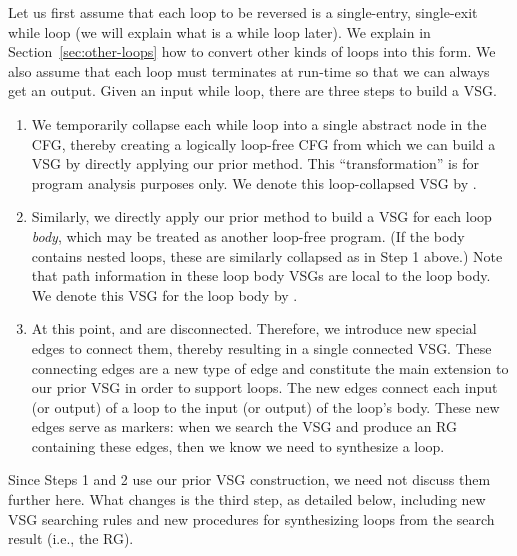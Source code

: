 Let us first assume that each loop to be reversed is a single-entry, single-exit while loop (we will explain what is a while loop later).
We explain in Section~\ref{sec:other-loops} how to convert other kinds of loops into this form.
We also assume that each loop must terminates at run-time so that we can always get an output.
Given an input while loop, there are three steps to build a VSG.
%
\begin{enumerate}

\item We temporarily collapse each while loop into a single abstract node in the CFG, thereby creating a logically loop-free CFG from which we can build a VSG by directly applying our prior method.
This ``transformation'' is for program analysis purposes only. 
We denote this loop-collapsed VSG by \pVSG.

\item Similarly, we directly apply our prior method to build a VSG for each loop \emph{body}, which may be treated as another loop-free program.
(If the body contains nested loops, these are similarly collapsed as in Step 1 above.)
Note that path information in these loop body VSGs are local to the loop body.
We denote this VSG for the loop body by \lVSG.

\item At this point, \pVSG and \lVSG are disconnected.
Therefore, we introduce new special edges to connect them, thereby resulting in a single connected VSG.
These connecting edges are a new type of edge and constitute the main extension to our prior VSG in order to support loops.
The new edges connect each input (or output) of a loop to the input (or output) of the loop's body.
These new edges serve as markers: when we search the VSG and produce an RG containing these edges, then we know we need to synthesize a loop.

\end{enumerate}
%
Since Steps 1 and 2 use our prior VSG construction, we need not discuss them further here.
What changes is the third step, as detailed below, including new VSG searching rules and new procedures for synthesizing loops from the search result (i.e., the RG). %

